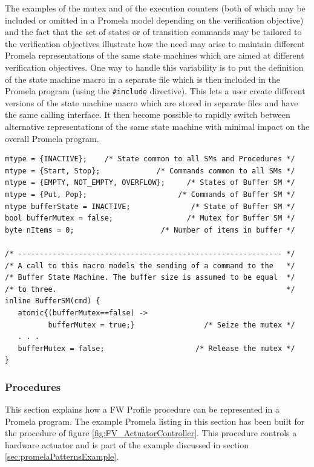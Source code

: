 \documentclass[a4paper,10pt]{article}
\begin{document}
The examples of the mutex and of the execution counters (both of which may be included or omitted in a Promela model depending on the verification objective) and the fact that the set of states or of transition commands may be tailored to the verification objectives illustrate how the need may arise to maintain different Promela representations of the same state machines which are aimed at different verification objectives. One way to handle this variability is to put the definition of the state machine macro in a separate file which is then included in the Promela program (using the \texttt{\#include} directive). This lets a user create different versions of the state machine macro which are stored in separate files and have the same calling interface. It then become possible to rapidly switch between alternative representations of the same state machine with minimal impact on the overall Promela program.

\begin{lstlisting}
mtype = {INACTIVE};    /* State common to all SMs and Procedures */
mtype = {Start, Stop};             /* Commands common to all SMs */
mtype = {EMPTY, NOT_EMPTY, OVERFLOW};     /* States of Buffer SM */
mtype = {Put, Pop};                     /* Commands of Buffer SM */
mtype bufferState = INACTIVE;              /* State of Buffer SM */
bool bufferMutex = false;                 /* Mutex for Buffer SM */
byte nItems = 0;                    /* Number of items in buffer */   

/* ------------------------------------------------------------- */
/* A call to this macro models the sending of a command to the   */ 
/* Buffer State Machine. The buffer size is assumed to be equal  */ 
/* to three.                                                     */
inline BufferSM(cmd) {
   atomic{(bufferMutex==false) ->
          bufferMutex = true;}                /* Seize the mutex */
   . . . 
   bufferMutex = false;                     /* Release the mutex */
} 
\end{lstlisting}

\subsubsection{Procedures}\label{sec:prPromelaPattern}
This section explains how a FW Profile procedure can be represented in a Promela program. The example Promela listing in this section has been built for the procedure of figure \ref{fig:FV_ActuatorController}. This procedure controls a hardware actuator and is part of the example discussed in section \ref{sec:promelaPatternsExample}. 
\end{document}
